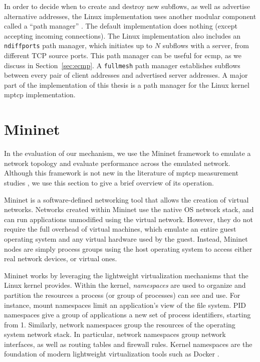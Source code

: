 \documentclass{cwru}
\begin{document}
In order to decide when to create and destroy new subflows, as well as advertise
alternative addresses, the Linux implementation uses another modular component
called a ``path manager'' \cite{mptcp}. The default implementation does nothing
(except accepting incoming connections). The Linux implementation also includes
an \texttt{ndiffports} path manager, which initiates up to $N$ subflows with a
server, from different TCP source ports. This path manager can be useful for
\ac{ecmp}, as we discuss in Section~\ref{sec:ecmp}. A \texttt{fullmesh} path
manager establishes subflows between every pair of client addresses and
advertised server addresses. A major part of the implementation of this thesis
is a path manager for the Linux kernel \ac{mptcp} implementation.


\section{Mininet}
\label{sec:mn}

In the evaluation of our mechanism, we use the Mininet \cite{mininet} framework
to emulate a network topology and evaluate performance across the emulated
network. Although this framework is not new in the literature of \ac{mptcp}
measurement studies \cite{paasch2013benefits,paasch2014experimental}, we use
this section to give a brief overview of its operation.

Mininet is a software-defined networking tool that allows the creation of
virtual networks. Networks created within Mininet use the native OS network
stack, and can run applications unmodified using the virtual network. However,
they do not require the full overhead of virtual machines, which emulate an
entire guest operating system and any virtual hardware used by the guest.
Instead, Mininet nodes are simply process groups using the host operating system
to access either real network devices, or virtual ones.

Mininet works by leveraging the lightweight virtualization mechanisms that the
Linux kernel provides. Within the kernel, \emph{namespaces} are used to organize
and partition the resources a process (or group of processes) can see and use.
For instance, mount namespaces limit an application's view of the file system.
PID namespaces give a group of applications a new set of process identifiers,
starting from 1. Similarly, network namespaces group the resources of the
operating system network stack. In particular, network namespaces group network
interfaces, as well as routing tables and firewall rules. Kernel namespaces are
the foundation of modern lightweight virtualization tools such as Docker
\cite{merkel2014docker}.
\end{document}

